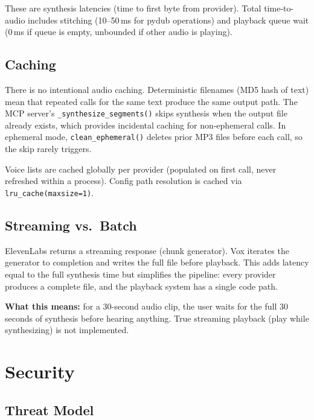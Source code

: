 \documentclass[a4paper,10pt]{article}
\begin{document}
These are synthesis latencies (time to first byte from provider).
Total time-to-audio includes stitching (10--50\,ms for pydub
operations) and playback queue wait (0\,ms if queue is empty,
unbounded if other audio is playing).

\subsection{Caching}

There is no intentional audio caching.  Deterministic filenames
(MD5 hash of text) mean that repeated calls for the same text
produce the same output path.  The MCP server's
\texttt{\_synthesize\_segments()} skips synthesis when the output
file already exists, which provides incidental caching for
non-ephemeral calls.  In ephemeral mode,
\texttt{clean\_ephemeral()} deletes prior MP3 files before each
call, so the skip rarely triggers.

Voice lists are cached globally per provider (populated on first
call, never refreshed within a process).  Config path resolution
is cached via \texttt{lru\_cache(maxsize=1)}.

\subsection{Streaming vs.\ Batch}

ElevenLabs returns a streaming response (chunk generator).  Vox
iterates the generator to completion and writes the full file
before playback.  This adds latency equal to the full synthesis
time but simplifies the pipeline: every provider produces a
complete file, and the playback system has a single code path.

\textbf{What this means:} for a 30-second audio clip, the user
waits for the full 30 seconds of synthesis before hearing anything.
True streaming playback (play while synthesizing) is not
implemented.


\section{Security}

\subsection{Threat Model}
\end{document}
